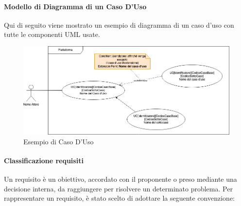 \paragraph{Modello di Diagramma di un Caso D'Uso}

Qui di seguito viene mostrato un esempio di diagramma di un caso d'uso con tutte le componenti UML usate.
\begin{figure}[!h]
\centering
\includegraphics[scale=0.5]{Contenuto/Immagini/UseCase.png}
\caption{Esempio di Caso D'Uso}
\end{figure}

\paragraph{Classificazione requisiti}

Un requisito è un obiettivo, accordato con il proponente o preso mediante una decisione interna, da raggiungere per risolvere un determinato problema. Per rappresentare un requisito, è stato scelto di adottare la seguente convenzione:

